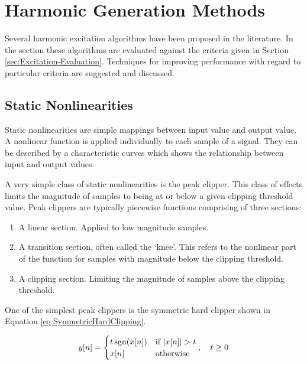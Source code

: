 \section{Harmonic Generation Methods}
\label{sec:Excitation-Methods}
	Several harmonic excitation algorithms have been proposed in the literature. In the section these algorithms are
	evaluated against the criteria given in Section \ref{sec:Excitation-Evaluation}. Techniques for improving
	performance with regard to particular criteria are suggested and discussed. 

	\subsection{Static Nonlinearities}
	\label{sec:Excitation-Statics}
		Static nonlinearities are simple mappings between input value and output value. A nonlinear function is
		applied individually to each sample of a signal. They can be described by a characteristic curves which
		shows the relationship between input and output values.
		
		A very simple class of static nonlinearities is the peak clipper. This class of effects limits the
		magnitude of samples to being at or below a given clipping threshold value. Peak clippers are typically
		piecewise functions comprising of three sections:

		\begin{enumerate}
			\item A linear section. Applied to low magnitude samples.
			\item A transition section, often called the `knee'. This refers to the nonlinear part of the
				function for samples with magnitude below the clipping threshold.
			\item A clipping section. Limiting the magnitude of samples above the clipping threshold.
		\end{enumerate}

		One of the simplest peak clippers is the symmetric hard clipper shown in Equation
		\ref{eq:SymmetricHardClipping}.

		\begin{equation}
			y[n] = \begin{cases}
				t\operatorname{sgn}(x[n]) & \text{if $|x[n]| > t$} \\
				x[n] & \text{otherwise}
			\end{cases}, \quad t \geq 0
			\label{eq:SymmetricHardClipping}
		\end{equation}

